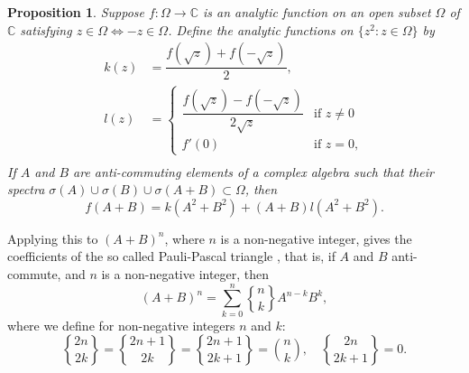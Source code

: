\documentclass[12pt,reqno]{amsart}
\newtheorem{prop}[theorem]{Proposition}
\begin{document}
\begin{prop}
\label{analytic}
Suppose $f:\Omega \to \mathbb C$ is an analytic function on an open subset $\Omega$ of $\mathbb C$ satisfying $z \in \Omega \Leftrightarrow -z \in \Omega$.  Define the analytic functions on $\{z^2 : z \in \Omega\}$ by
\begin{align}
\label{g a}
k(z) &= \dfrac{f(\sqrt z) + f(-\sqrt z)}{2} ,\\
\label{h a}
l(z) &= \begin{cases}
\dfrac{f(\sqrt z) - f(-\sqrt z)}{2\sqrt z} &\text{if $z \ne 0$} \\
f'(0) &\text{if $z = 0$} ,
\end{cases} \\
\end{align}
If $A$ and $B$ are anti-commuting elements of a complex algebra such that their spectra $\sigma(A) \cup \sigma(B) \cup \sigma(A+B) \subset \Omega$, then
\begin{equation}
f(A+B) = k(A^2+B^2) + (A+B) l(A^2+B^2) .
\end{equation}
\end{prop}

Applying this to $(A+B)^n$, where $n$ is a non-negative integer, gives the coefficients of the so called Pauli-Pascal triangle \cite{horn,sloane}, that is, if $A$ and $B$ anti-commute, and $n$ is a non-negative integer, then
\begin{equation}
(A + B)^n = \sum_{k=0}^n  \genfrac\{\}{0pt}0nk  A^{n-k} B^k ,
\end{equation}
where we define for non-negative integers $n$ and $k$:
\begin{equation}
\genfrac\{\}{0pt}0{2n}{2 k} = \genfrac\{\}{0pt}0{2n + 1}{2 k} =
\genfrac\{\}{0pt}0{2n + 1}{2 k + 1} = \binom n k , \quad
\genfrac\{\}{0pt}0{2n}{2 k + 1}  = 0.
\end{equation}


\end{document}
